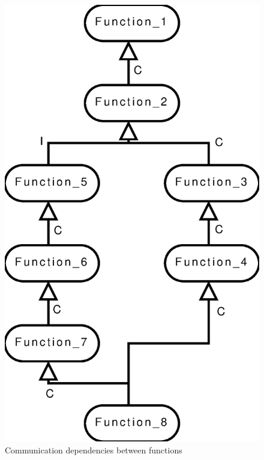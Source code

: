 \documentclass[a4paper,11pt]{article}
\begin{document}
\begin{figure}
\begin{center}
\includegraphics*[scale=0.5]{example_dgraph_1.eps}
\caption{Communication dependencies between functions}
\label{fig:d1example}
\end{center}
\end{figure}
\end{document}
